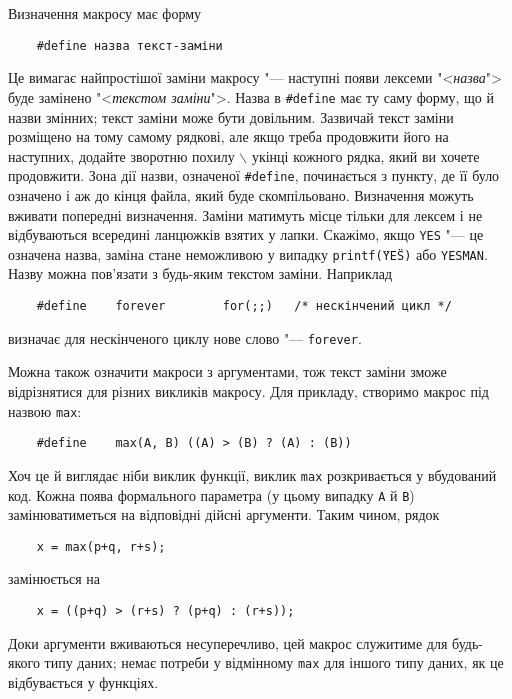 \documentclass[a4paper,12pt]{book}
\begin{document}
  Визначення макросу має форму
  \begin{verbatim}
    #define назва текст-заміни
  \end{verbatim}

  Це вимагає найпростішої заміни макросу "--- наступні появи лексеми
  "<\textit{назва}"> буде замінено "<\textit{текстом заміни}">. Назва в
  \texttt{\#define} має ту саму форму, що й назви змінних; текст заміни може бути
  довільним. Зазвичай текст заміни розміщено на тому самому рядкові, але якщо треба
  продовжити його на наступних, додайте зворотню похилу \texttt{\mbox{$\backslash$}} укінці кожного рядка,
  який ви хочете продовжити. Зона дії назви, означеної \texttt{\#define}, починається з
  пункту, де її було означено і аж до кінця файла, який буде скомпільовано. Визначення
  можуть вживати попередні визначення. Заміни матимуть місце тільки для лексем і не
  відбуваються всередині ланцюжків взятих у лапки. Скажімо, якщо \texttt{YES} "--- це
  означена назва, заміна стане неможливою у випадку \texttt{printf(\"{}YES\"{})} або
  \texttt{YESMAN}. Назву можна пов'язати з будь-яким текстом заміни. Наприклад
  \begin{verbatim}
    #define    forever        for(;;)   /* нескінчений цикл */
  \end{verbatim}
  визначає для нескінченого циклу нове слово "--- \texttt{forever}.

  Можна також означити макроси з аргументами, тож текст заміни зможе відрізнятися для
  різних викликів макросу. Для прикладу, створимо макрос під назвою \texttt{max}:
  \begin{verbatim}
    #define    max(A, B) ((A) > (B) ? (A) : (B))
  \end{verbatim}

  Хоч це й виглядає ніби виклик функції, виклик \texttt{max} розкривається у вбудований
  код. Кожна поява формального параметра (у цьому випадку \texttt{A} й \texttt{B})
  замінюватиметься на відповідні дійсні аргументи. Таким чином, рядок
  \begin{verbatim}
    x = max(p+q, r+s);
  \end{verbatim}
  замінюється на
  \begin{verbatim}
    x = ((p+q) > (r+s) ? (p+q) : (r+s));
  \end{verbatim}

  Доки аргументи вживаються несуперечливо, цей макрос служитиме для будь-якого типу даних;
  немає потреби у відмінному \texttt{max} для іншого типу даних, як це відбувається у
  функціях.
\end{document}
